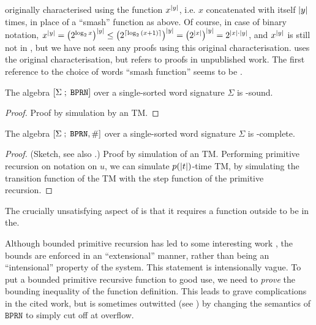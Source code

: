 \begin{remark} \cite{cobham-1965} originally characterised \FPTIME{} using the
function $x^{\mathopen{}\left|{y}\right|\mathclose{}}$, i.e. $x$ concatenated with itself ${\mathopen{}\left|{y}\right|\mathclose{}}$ times, in
place of a ``smash'' function as above. Of course, in case of binary notation,
$x^{\mathopen{}\left|{y}\right|\mathclose{}} = {\mathopen{}\left({2^{\log_2{x}}}\right)\mathclose{}}^{\mathopen{}\left|{y}\right|\mathclose{}} \leq {\ensuremath{\mathopen{}\left({2^{\mathopen{}\left\lceil{\log_2{\ensuremath{\mathopen{}\left({x+1}\right)\mathclose{}}}}\right\rceil\mathclose{}}}\right)\mathclose{}}}^{\mathopen{}\left|{y}\right|\mathclose{}}
= {\mathopen{}\left({2^{\mathopen{}\left|{x}\right|\mathclose{}}}\right)\mathclose{}}^{\mathopen{}\left|{y}\right|\mathclose{}} = 2^{{\mathopen{}\left|{x}\right|\mathclose{}} \cdot {\ensuremath{\mathopen{}\left|{y}\right|\mathclose{}}}}$, and $x^{\mathopen{}\left|{y}\right|\mathclose{}}$ is
still not in \FPTIME{}, but we have not seen any proofs using this original
characterisation. \cite{cook-1975} uses the original characterisation, but
refers to proofs in unpublished work.  The first reference to the choice of
words ``smash function'' seems to be \cite{buss-phd-1985-6}.  \end{remark}

\begin{theorem} \label{thm:bprn-fptime-sound} The algebra
$\mathopen{}\left[{\Sigma\mathrel{};\mathrel{}\mathtt{BPRN}}\right]\mathclose{}$ over a single-sorted word signature $\Sigma$
is \FPTIME{}-sound.\end{theorem}

\begin{proof} Proof by simulation by an \FPTIME{} TM. \end{proof}

\begin{theorem} \label{thm:bprn-fptime-complete} The algebra
$\mathopen{}\left[{\Sigma\mathrel{};\mathrel{}\mathtt{BPRN},\mathtt{\#}}\right]\mathclose{}$ over a single-sorted word
signature $\Sigma$ is \FPTIME{}-complete.\end{theorem}

\begin{proof} (Sketch, see also \cite{rose-1984}.) Proof by simulation of an
\FPTIME{} TM. Performing primitive recursion on notation on $u$, we can
simulate $p{\mathopen{}\left({{\mathopen{}\left|{t}\right|\mathclose{}}}\right)\mathclose{}}$-time TM, by simulating the transition function of the
TM with the step function of the primitive recursion. \end{proof}

The crucially unsatisfying aspect of \cite{thm:bprn-fptime-complete} is that it requires a function outside \FPTIME{} to be in the.


Although bounded primitive recursion has led to some interesting work
\cite{cook-1975, buss-phd-1985-6, cook-urquhart-1993}, the bounds are enforced
in an ``extensional'' manner, rather than being an ``intensional'' property of
the system. This statement is intensionally vague. To put a bounded primitive
recursive function to good use, we need to \emph{prove} the bounding inequality
of the function definition. This leads to grave complications in the cited
work, but is sometimes outwitted (see \cite{cook-urquhart-1993}) by changing
the semantics of $\mathtt{BPRN}$ to simply cut off at overflow.

